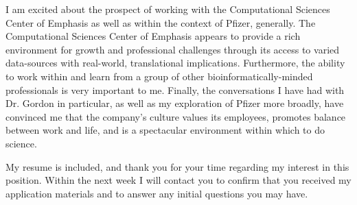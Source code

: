\documentclass[11pt,letterpaper,sans,draft]{moderncv}
\begin{document}

I am excited about the prospect of working with the Computational Sciences Center of Emphasis as well as within the context of Pfizer, generally.
The Computational Sciences Center of Emphasis appears to provide a rich environment for growth and professional challenges through its access to varied data-sources with real-world, translational implications.
Furthermore, the ability to work within and learn from a group of other bioinformatically-minded professionals is very important to me.
Finally, the conversations I have had with Dr. Gordon in particular, as well as my exploration of Pfizer more broadly, have convinced me that the company's culture values its employees, promotes balance between work and life, and is a spectacular environment within which to do science.

My resume is included, and thank you for your time regarding my interest in this position.
Within the next week I will contact you to confirm that you received my application materials and to answer any initial questions you may have.

\makeletterclosing

\end{document}
